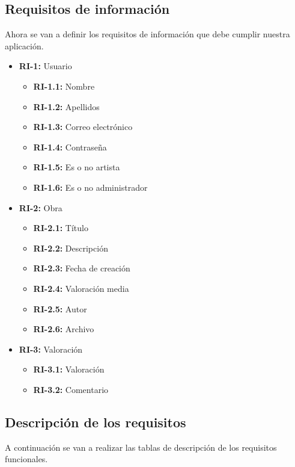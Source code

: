 \subsection{Requisitos de información}
Ahora se van a definir los requisitos de información que debe cumplir nuestra
aplicación.

\begin{itemize}
    \item \textbf{RI-1:} Usuario
    \begin{itemize}
        \item \textbf{RI-1.1:} Nombre
        \item \textbf{RI-1.2:} Apellidos
        \item \textbf{RI-1.3:} Correo electrónico
        \item \textbf{RI-1.4:} Contraseña
        \item \textbf{RI-1.5:} Es o no artista
        \item \textbf{RI-1.6:} Es o no administrador
    \end{itemize}
    \item \textbf{RI-2:} Obra
    \begin{itemize}
        \item \textbf{RI-2.1:} Título
        \item \textbf{RI-2.2:} Descripción
        \item \textbf{RI-2.3:} Fecha de creación
        \item \textbf{RI-2.4:} Valoración media
        \item \textbf{RI-2.5:} Autor
        \item \textbf{RI-2.6:} Archivo
    \end{itemize}
    \item \textbf{RI-3:} Valoración
    \begin{itemize}
        \item \textbf{RI-3.1:} Valoración
        \item \textbf{RI-3.2:} Comentario
    \end{itemize}
\end{itemize}

\subsection{Descripción de los requisitos}
A continuación se van a realizar las tablas de descripción de los requisitos funcionales.

